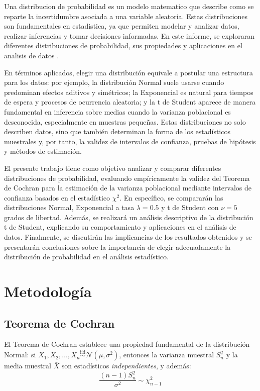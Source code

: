\documentclass[11pt]{article}
\begin{document}
Una distribucion de probabilidad es un modelo matematico que describe como se reparte la incertidumbre asociada a una variable aleatoria. Estas distribuciones son fundamentales en estadistica, ya que permiten modelar y analizar datos, realizar inferencias y tomar decisiones informadas. En este informe, se exploraran diferentes distribuciones de probabilidad, sus propiedades y aplicaciones en el analisis de datos \cite{fisher1922mathematical}.

En términos aplicados, elegir una distribución equivale a postular una estructura para los datos: por ejemplo, la distribución Normal suele usarse cuando predominan efectos aditivos y simétricos; la Exponencial es natural para tiempos de espera y procesos de ocurrencia aleatoria; y la t de Student aparece de manera fundamental en inferencia sobre medias cuando la varianza poblacional es desconocida, especialmente en muestras pequeñas. Estas distribuciones no solo describen datos, sino que también determinan la forma de los estadísticos muestrales y, por tanto, la validez de intervalos de confianza, pruebas de hipótesis y métodos de estimación.

El presente trabajo tiene como objetivo analizar y comparar diferentes distribuciones 
de probabilidad, evaluando empíricamente la validez del Teorema de Cochran para la 
estimación de la varianza poblacional mediante intervalos de confianza basados en el 
estadístico $\chi^2$. En específico, se compararán las distribuciones Normal, 
Exponencial a tasa $\lambda = 0.5$ y t de Student con $\nu = 5$ grados de libertad. 
Además, se realizará un análisis descriptivo de la distribución t de Student, 
explicando su comportamiento y aplicaciones en el análisis de datos. Finalmente, 
se discutirán las implicancias de los resultados obtenidos y se presentarán 
conclusiones sobre la importancia de elegir adecuadamente la distribución de 
probabilidad en el análisis estadístico.

\section{Metodología}

\subsection{Teorema de Cochran}

El Teorema de Cochran \cite{cochran1934distribution} establece una propiedad fundamental de la distribución 
Normal: si $X_1, X_2, \ldots, X_n \overset{\text{iid}}{\sim} \mathcal{N}(\mu, 
\sigma^2)$, entonces la varianza muestral $S_n^2$ y la media muestral $\bar{X}$ 
son estadísticos \textit{independientes}, y además:
\begin{equation}
    \frac{(n-1)S_n^2}{\sigma^2} \sim \chi^2_{n-1}
\end{equation}
\end{document}
